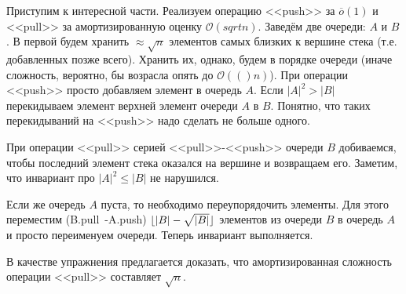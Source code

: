 \documentclass[addpoints]{exam}
\renewcommand{\O}[1]{\mathcal{O}(#1)}
\renewcommand{\o}[1]{\overline{o}(#1)}
\DeclarePairedDelimiter\floor{\lfloor}{\rfloor}
\begin{document}
\begin{questions}
\begin{solution}
Приступим к интересной части. Реализуем операцию <<push>> за $\o{1}$ и <<pull>> за амортизированную оценку $\O{sqrt{n}}$. Заведём две очереди: $A$ и $B$. В первой будем хранить $\approx \sqrt{n}$ элементов самых близких к вершине стека (т.е. добавленных позже всего). Хранить их, однако, будем в порядке очереди (иначе сложность, вероятно, бы возрасла опять до $\O(n)$). При операции <<push>> просто добавляем элемент в очередь $A$. Если $|A|^2 > |B|$ перекидываем элемент верхней элемент очереди $A$ в $B$. Понятно, что таких перекидываний на <<push>> надо сделать не больше одного.

При операции <<pull>> серией <<pull>>-<<push>> очереди $B$ добиваемся, чтобы последний элемент стека оказался на вершине и возвращаем его. Заметим, что инвариант про $|A|^2 \leqslant |B|$ не нарушился.

Если же очередь $A$ пуста, то необходимо переупорядочить элементы. Для этого переместим (B.pull~-A.push) $\floor{|B| - \sqrt{|B|}}$ элементов из очереди $B$ в очередь $A$ и просто переименуем очереди. Теперь инвариант выполняется.

В качестве упражнения предлагается доказать, что амортизированная сложность операции <<pull>> составляет $\sqrt{n}$.


\end{solution}

\end{questions}
\end{document}
